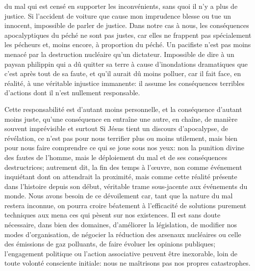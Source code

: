 \begin{singlequote}
du mal qui est censé en supporter les inconvénients, sans quoi il n'y a plus de justice. Si l'accident de voiture que cause mon imprudence blesse ou tue un innocent, impossible de parler de justice. Dans notre cas à nous, les conséquences apocalyptiques du péché ne sont pas justes, car elles ne frappent pas spécialement les pécheurs et, moins encore, à proportion du péché. Un pacifiste n'est pas moins menacé par la destruction nucléaire qu'un dictateur. Impossible de dire à un paysan philippin qui a dû quitter sa terre à cause d'inondations dramatiques que c'est après tout de sa faute, et qu'il aurait dû moins polluer, car il fait face, en réalité, à une véritable injustice immanente: il assume les conséquences terribles d'actions dont il n'est nullement responsable.

Cette responsabilité est d'autant moins personnelle, et la conséquence d'autant moins juste, qu'une conséquence en entraîne une autre, en chaîne, de manière souvent imprévisible et surtout Si Jésus tient un discours d'apocalypse, de révélation, ce n'est pas pour nous terrifier plus ou moins utilement, mais bien pour nous faire comprendre ce qui se joue sous nos yeux: non la punition divine des fautes de l'homme, mais le déploiement du mal et de ses conséquences destructrices; autrement dit, la fin des temps à l'œuvre, non comme événement inquiétant dont on attendrait la proximité, mais comme cette réalité présente dans l'histoire depuis son début, véritable trame sous-jacente aux événements du monde. Nous avons besoin de ce dévoilement car, tant que la nature du mal restera inconnue, on pourra croire béatement à l'efficacité de solutions purement techniques aux mena ces qui pèsent sur nos existences. Il est sans doute nécessaire, dans bien des domaines, d'améliorer la législation, de modifier nos modes d'organisation, de négocier la réduction des arsenaux nucléaires ou celle des émissions de gaz polluants, de faire évoluer les opinions publiques; l'engagement politique ou l'action associative peuvent être  inexorable, loin de toute volonté consciente initiale: nous ne maîtrisons pas nos propres catastrophes.
\end{singlequote}

